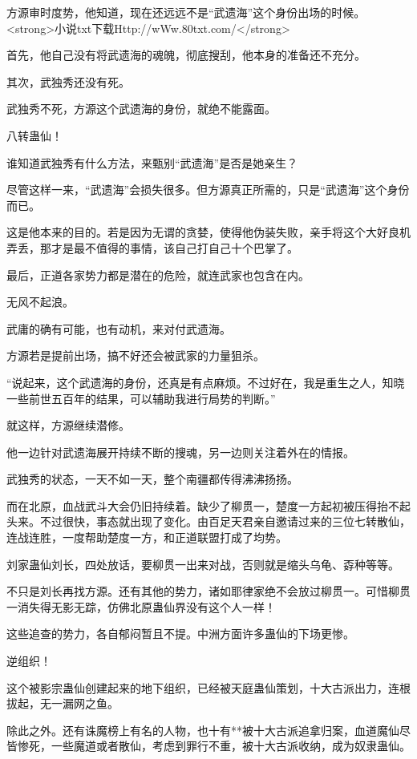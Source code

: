 
\begin{this_body}

方源审时度势，他知道，现在还远远不是“武遗海”这个身份出场的时候。<strong>小说txt下载Http://wWw.80txt.com/</strong>

首先，他自己没有将武遗海的魂魄，彻底搜刮，他本身的准备还不充分。

其次，武独秀还没有死。

武独秀不死，方源这个武遗海的身份，就绝不能露面。

八转蛊仙！

谁知道武独秀有什么方法，来甄别“武遗海”是否是她亲生？

尽管这样一来，“武遗海”会损失很多。但方源真正所需的，只是“武遗海”这个身份而已。

这是他本来的目的。若是因为无谓的贪婪，使得他伪装失败，亲手将这个大好良机弄丢，那才是最不值得的事情，该自己打自己十个巴掌了。

最后，正道各家势力都是潜在的危险，就连武家也包含在内。

无风不起浪。

武庸的确有可能，也有动机，来对付武遗海。

方源若是提前出场，搞不好还会被武家的力量狙杀。

“说起来，这个武遗海的身份，还真是有点麻烦。不过好在，我是重生之人，知晓一些前世五百年的结果，可以辅助我进行局势的判断。”

就这样，方源继续潜修。

他一边针对武遗海展开持续不断的搜魂，另一边则关注着外在的情报。

武独秀的状态，一天不如一天，整个南疆都传得沸沸扬扬。

而在北原，血战武斗大会仍旧持续着。缺少了柳贯一，楚度一方起初被压得抬不起头来。不过很快，事态就出现了变化。由百足天君亲自邀请过来的三位七转散仙，连战连胜，一度帮助楚度一方，和正道联盟打成了均势。

刘家蛊仙刘长，四处放话，要柳贯一出来对战，否则就是缩头乌龟、孬种等等。

不只是刘长再找方源。还有其他的势力，诸如耶律家绝不会放过柳贯一。可惜柳贯一消失得无影无踪，仿佛北原蛊仙界没有这个人一样！

这些追查的势力，各自郁闷暂且不提。中洲方面许多蛊仙的下场更惨。

逆组织！

这个被影宗蛊仙创建起来的地下组织，已经被天庭蛊仙策划，十大古派出力，连根拔起，无一漏网之鱼。

除此之外。还有诛魔榜上有名的人物，也十有**被十大古派追拿归案，血道魔仙尽皆惨死，一些魔道或者散仙，考虑到罪行不重，被十大古派收纳，成为奴隶蛊仙。


\end{this_body}
